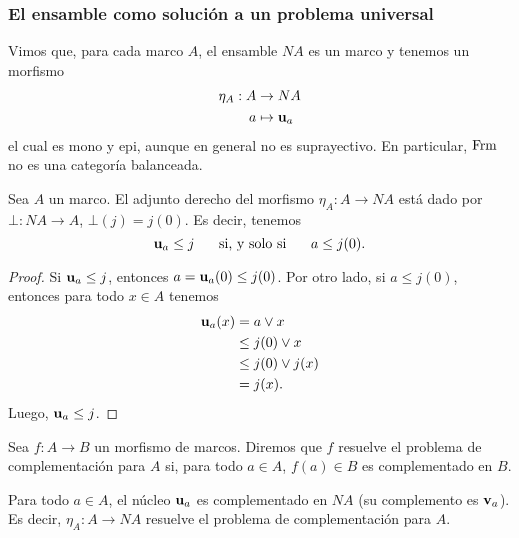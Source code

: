 
\subsubsection{El ensamble como solución a un problema universal}
\label{ssec:complementacion}

Vimos que, para cada marco $A$, el ensamble $NA$ es un marco y
tenemos un morfismo
\begin{align*}
  \eta_A: A&\to NA \\
  a &\mapsto \mathbf u_{a}
\end{align*}
el cual es mono y epi, aunque en general no es suprayectivo.
En particular, $\mathrm{Frm}$ no es una categoría balanceada.

\begin{cor}
  Sea $A$ un marco.
  El adjunto derecho del morfismo $\eta_A:A\to NA$ está dado por
  $\bot:NA\to A$, $\bot(j)=j(0)$.
  Es decir, tenemos
  \[
    \mathbf u_{a} \leq j \hspace{5mm}\text{ si, y solo si }\hspace{5mm} a\leq j(0) 
  .\]
\end{cor}
\begin{proof}
  Si $\mathbf u_{a} \leq j$, entonces
  $a=\mathbf u_{a}(0) \leq j(0)$.
  Por otro lado, si $a\leq j(0)$, entonces para todo $x\in A$
  tenemos
  \begin{align*}
    \mathbf u_{a} (x)
    &= a\vee x \\
    &\leq j(0) \vee x \\
    &\leq j(0) \vee j(x) \\
    &= j(x).
  \end{align*}
  Luego, $\mathbf u_{a} \leq j$.
\end{proof}

\begin{defn}
  Sea $f:A\to B$ un morfismo de marcos.
  Diremos que $f$ resuelve el problema de complementación para
  $A$ si, para todo $a\in A$, $f(a)\in B$ es complementado en
  $B$.
\end{defn}
\begin{exa}
  Para todo $a\in A$, el núcleo $\mathbf u_{a}$ es complementado en
  $NA$ (su complemento es $\mathbf v_{a}$).
  Es decir, $\eta_A:A\to NA$ resuelve el problema de
  complementación para $A$.
\end{exa}

